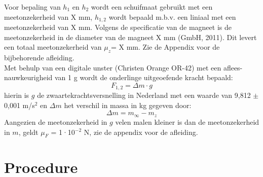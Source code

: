 Voor bepaling van $h_1$ en $h_2$ wordt een schuifmaat gebruikt met een meetonzekerheid van X mm, $h_{1,2}$ wordt bepaald m.b.v. een liniaal met een meetonzekerheid van X mm. Volgens de specificatie van de magneet is de meetonzekerheid in de diameter van de magneet X mm (GmbH, 2011). Dit levert een totaal meetonzekerheid van $\mu_z$= X mm. Zie de Appendix voor de bijbehorende afleiding.\\
Met behulp van een digitale unster (Christen Orange OR-42) met een aflees-nauwkeurigheid van 1 g wordt de onderlinge uitgeoefende kracht bepaald:
\begin{equation}
    F_{1,2}=\Delta m \cdot g
\end{equation}
hierin is $g$ de zwaartekrachtsversnelling in Nederland met een waarde van 9,812 $\pm$ 0,001 m/s$^{2}$ en $\Delta m$ het verschil in massa in kg gegeven door:
\begin{equation}
    \Delta m=m_\infty-m_z			
\end{equation}
Aangezien de meetonzekerheid in $g$ velen malen kleiner is dan de meetonzekerheid in $m$, geldt $\mu_F$ = 1·10$^{-2}$ N, zie de appendix voor de afleiding.

\section{Procedure}